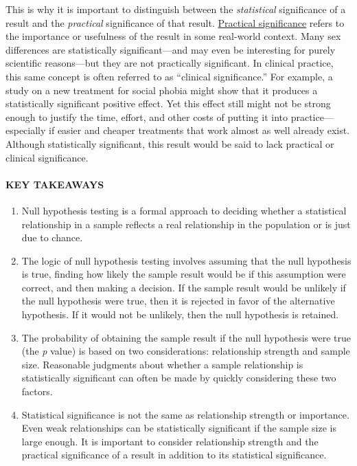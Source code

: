 \documentclass[
]{krantz}
\providecommand{\tightlist}{%
  \setlength{\itemsep}{0pt}\setlength{\parskip}{0pt}}
\begin{document}
This is why it is important to distinguish between the \emph{statistical} significance of a result and the \emph{practical} significance of that result. \hyperref[practical-significance]{Practical significance} refers to the importance or usefulness of the result in some real-world context. Many sex differences are statistically significant---and may even be interesting for purely scientific reasons---but they are not practically significant. In clinical practice, this same concept is often referred to as ``clinical significance.'' For example, a study on a new treatment for social phobia might show that it produces a statistically significant positive effect. Yet this effect still might not be strong enough to justify the time, effort, and other costs of putting it into practice---especially if easier and cheaper treatments that work almost as well already exist. Although statistically significant, this result would be said to lack practical or clinical significance.

\paragraph*{KEY TAKEAWAYS}\label{key-takeaways-36}

\begin{enumerate}
\def\labelenumi{\arabic{enumi}.}
\tightlist
\item
  Null hypothesis testing is a formal approach to deciding whether a statistical relationship in a sample reflects a real relationship in the population or is just due to chance.
\item
  The logic of null hypothesis testing involves assuming that the null hypothesis is true, finding how likely the sample result would be if this assumption were correct, and then making a decision. If the sample result would be unlikely if the null hypothesis were true, then it is rejected in favor of the alternative hypothesis. If it would not be unlikely, then the null hypothesis is retained.
\item
  The probability of obtaining the sample result if the null hypothesis were true (the \emph{p} value) is based on two considerations: relationship strength and sample size. Reasonable judgments about whether a sample relationship is statistically significant can often be made by quickly considering these two factors.
\item
  Statistical significance is not the same as relationship strength or importance. Even weak relationships can be statistically significant if the sample size is large enough. It is important to consider relationship strength and the practical significance of a result in addition to its statistical significance.
\end{enumerate}
\end{document}

